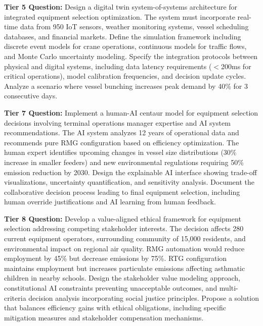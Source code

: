 \documentclass{article}
\begin{document}
\textbf{Tier 5 Question:} Design a digital twin system-of-systems architecture for integrated equipment selection optimization. The system must incorporate real-time data from 950 IoT sensors, weather monitoring systems, vessel scheduling databases, and financial markets. Define the simulation framework including discrete event models for crane operations, continuous models for traffic flows, and Monte Carlo uncertainty modeling. Specify the integration protocols between physical and digital systems, including data latency requirements ($<$200ms for critical operations), model calibration frequencies, and decision update cycles. Analyze a scenario where vessel bunching increases peak demand by 40\% for 3 consecutive days.

\textbf{Tier 7 Question:} Implement a human-AI centaur model for equipment selection decisions involving terminal operations manager expertise and AI system recommendations. The AI system analyzes 12 years of operational data and recommends pure RMG configuration based on efficiency optimization. The human expert identifies upcoming changes in vessel size distributions (30\% increase in smaller feeders) and new environmental regulations requiring 50\% emission reduction by 2030. Design the explainable AI interface showing trade-off visualizations, uncertainty quantification, and sensitivity analysis. Document the collaborative decision process leading to final equipment selection, including human override justifications and AI learning from human feedback.

\textbf{Tier 8 Question:} Develop a value-aligned ethical framework for equipment selection addressing competing stakeholder interests. The decision affects 280 current equipment operators, surrounding community of 15,000 residents, and environmental impact on regional air quality. RMG automation would reduce employment by 45\% but decrease emissions by 75\%. RTG configuration maintains employment but increases particulate emissions affecting asthmatic children in nearby schools. Design the stakeholder value modeling approach, constitutional AI constraints preventing unacceptable outcomes, and multi-criteria decision analysis incorporating social justice principles. Propose a solution that balances efficiency gains with ethical obligations, including specific mitigation measures and stakeholder compensation mechanisms.
\end{document}
